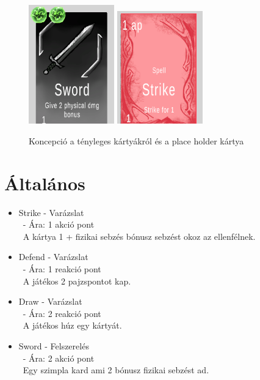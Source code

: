 \begin{figure}[h]
        \centering
        \includegraphics[width=140px,keepaspectratio]{images/SwordPic.png}
        \includegraphics[width=140px,keepaspectratio]{images/Strike.png}
        \label{POC}
        \caption { Koncepció a tényleges kártyákról és a place holder kártya}
    \hspace{1em}
\end{figure}

\section{Általános}

\begin{itemize}
    \item Strike - Varázslat\\\
    - Ára: 1 akció pont \\\
    A kártya 1 + fizikai sebzés bónusz sebzést okoz az ellenfélnek.
    \item Defend - Varázslat\\\
    - Ára: 1 reakció pont \\\
    A játékos 2 pajzspontot kap.
    \item Draw - Varázslat\\\
    - Ára: 2 reakció pont \\\
    A játékos húz egy kártyát.
    \item Sword - Felszerelés\\\
    - Ára: 2 akció pont \\\
    Egy szimpla kard  ami 2 bónusz fizikai sebzést ad.
\end{itemize}


